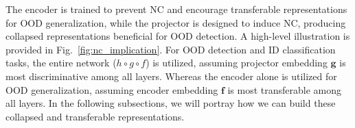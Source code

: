 

The encoder is trained to prevent NC and encourage transferable representations for OOD generalization, while the projector is designed to induce NC, producing collapsed representations beneficial for OOD detection. 
A high-level illustration is provided in Fig.~\ref{fig:nc_implication}.
For OOD detection and ID classification tasks, the entire network ($h \circ g \circ f$) is utilized, assuming projector embedding $\mathrm{\mathbf{g}}$ is most discriminative among all layers.
Whereas the encoder alone is utilized for OOD generalization, assuming encoder embedding $\mathrm{\mathbf{f}}$ is most transferable among all layers.
In the following subsections, we will portray how we can build these collapsed and transferable representations.


